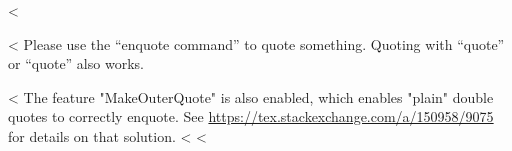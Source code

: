 <%

<%
Please use the \enquote{enquote command} to quote something.
Quoting with "`quote"' or ``quote'' also works. %

<%
The feature "MakeOuterQuote" is also enabled, which enables "plain" double quotes to correctly enquote.
See \url{https://tex.stackexchange.com/a/150958/9075} for details on that solution.
<%
<%
